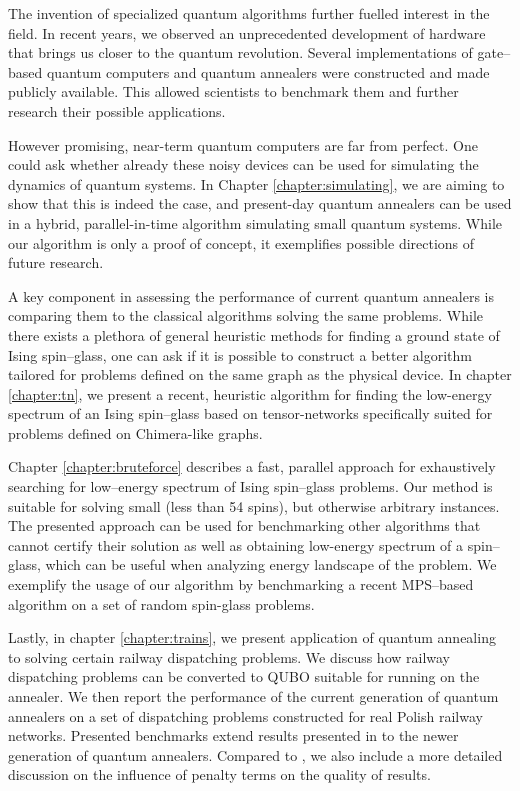 The invention of specialized quantum algorithms further fuelled interest in the field. In recent years, we observed an unprecedented development of hardware that brings us closer to the quantum revolution. Several implementations of gate--based quantum computers \cite{ionq, bohnet} and quantum annealers \cite{johnson, dattani} were constructed and made publicly available. This allowed scientists to benchmark them and further research their possible applications.

However promising, near-term quantum computers are far from perfect. One could ask whether already
these noisy devices can be used for simulating the dynamics of quantum systems. In Chapter \ref{chapter:simulating}, we
are aiming to show that this is indeed the case, and present-day quantum annealers can be used in a
hybrid, parallel-in-time algorithm simulating small quantum systems. While our algorithm is only a
proof of concept, it exemplifies possible directions of future research.

A key component in assessing the performance of current quantum annealers is comparing them to the
classical algorithms solving the same problems. While there exists a plethora of general heuristic
methods for finding a ground state of Ising spin--glass, one can ask if it is possible to construct
a better algorithm tailored for problems defined on the same graph as the physical device.
In chapter \ref{chapter:tn}, we present a recent, heuristic algorithm for finding the low-energy
spectrum of an Ising spin--glass based on tensor-networks specifically suited for problems defined
on Chimera-like graphs.

Chapter \ref{chapter:bruteforce} describes a fast, parallel approach for exhaustively searching for
low--energy spectrum of Ising spin--glass problems. Our method is suitable for solving small (less
than 54 spins), but otherwise arbitrary instances. The presented approach can be used for
benchmarking other algorithms that cannot certify their solution as well as obtaining low-energy
spectrum of a spin--glass, which can be useful when analyzing energy landscape of the problem.
We exemplify the usage of our algorithm by benchmarking a recent MPS--based algorithm on a set of
random spin-glass problems.

Lastly, in chapter \ref{chapter:trains}, we present application of quantum annealing to solving
certain railway dispatching problems. We discuss how railway dispatching problems can be converted
to QUBO suitable for running on the annealer. We then report the performance of the current generation
of quantum annealers on a set of dispatching problems constructed for real Polish railway networks.
Presented benchmarks extend results presented in \cite{trains} to the newer generation of quantum annealers.
Compared to \cite{trains}, we also include a more detailed discussion on the influence of penalty terms
on the quality of results.
